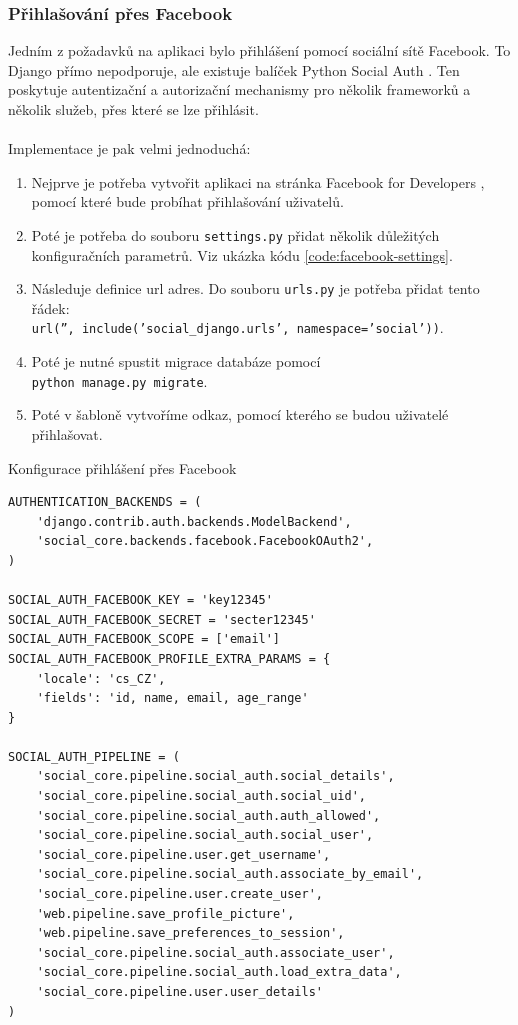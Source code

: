 \subsubsection{Přihlašování přes Facebook}
Jedním z požadavků na aplikaci bylo přihlášení pomocí sociální sítě Facebook. To Django přímo nepodporuje, ale existuje balíček Python Social Auth \cite{python-social-auth}. Ten poskytuje autentizační a autorizační mechanismy pro několik frameworků a několik služeb, přes které se lze přihlásit.
\\\\
Implementace je pak velmi jednoduchá:
\begin{enumerate}
    \item Nejprve je potřeba vytvořit aplikaci na stránka Facebook for Developers \cite{facebook-developers}, pomocí které bude probíhat přihlašování uživatelů.
    \item Poté je potřeba do souboru \texttt{settings.py} přidat několik důležitých konfiguračních parametrů. Viz ukázka kódu \ref{code:facebook-settings}.
    \item Následuje definice url adres. Do souboru \texttt{urls.py} je potřeba přidat tento řádek:\\\texttt{url('', include('social\_django.urls', namespace='social'))}.
    \item Poté je nutné spustit migrace databáze pomocí \\\texttt{python manage.py migrate}.
    \item Poté v šabloně vytvoříme odkaz, pomocí kterého se budou uživatelé přihlašovat.
\end{enumerate}

\begin{listing}[h]
\caption{\label{code:facebook-settings}Konfigurace přihlášení přes Facebook}
\begin{verbatim}
AUTHENTICATION_BACKENDS = (
    'django.contrib.auth.backends.ModelBackend',
    'social_core.backends.facebook.FacebookOAuth2',
)

SOCIAL_AUTH_FACEBOOK_KEY = 'key12345'
SOCIAL_AUTH_FACEBOOK_SECRET = 'secter12345'
SOCIAL_AUTH_FACEBOOK_SCOPE = ['email']
SOCIAL_AUTH_FACEBOOK_PROFILE_EXTRA_PARAMS = {
    'locale': 'cs_CZ',
    'fields': 'id, name, email, age_range'
}

SOCIAL_AUTH_PIPELINE = (
    'social_core.pipeline.social_auth.social_details',
    'social_core.pipeline.social_auth.social_uid',
    'social_core.pipeline.social_auth.auth_allowed',
    'social_core.pipeline.social_auth.social_user',
    'social_core.pipeline.user.get_username',
    'social_core.pipeline.social_auth.associate_by_email',
    'social_core.pipeline.user.create_user',
    'web.pipeline.save_profile_picture',
    'web.pipeline.save_preferences_to_session',
    'social_core.pipeline.social_auth.associate_user',
    'social_core.pipeline.social_auth.load_extra_data',
    'social_core.pipeline.user.user_details'
)
\end{verbatim}
\end{listing}


